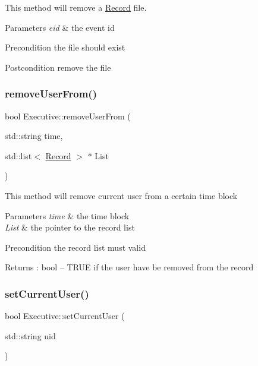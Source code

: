 This method will remove a \mbox{\hyperlink{class_record}{Record}} file. 
\begin{DoxyParams}{Parameters}
{\em eid} & the event id \\
\hline
\end{DoxyParams}
\begin{DoxyPrecond}{Precondition}
the file should exist 
\end{DoxyPrecond}
\begin{DoxyPostcond}{Postcondition}
remove the file 
\end{DoxyPostcond}
\mbox{\label{class_executive_a1df250bced0d7d74ce5017cd1a225e4d}} 
\subsubsection{\texorpdfstring{remove\+User\+From()}{removeUserFrom()}}
{\footnotesize\ttfamily bool Executive\+::remove\+User\+From (\begin{DoxyParamCaption}\item[{std\+::string}]{time,  }\item[{std\+::list$<$ \mbox{\hyperlink{class_record}{Record}} $>$ $\ast$}]{List }\end{DoxyParamCaption})}

This method will remove current user from a certain time block 
\begin{DoxyParams}{Parameters}
{\em time} & the time block \\
\hline
{\em List} & the pointer to the record list \\
\hline
\end{DoxyParams}
\begin{DoxyPrecond}{Precondition}
the record list must valid 
\end{DoxyPrecond}
\begin{DoxyReturn}{Returns}
\+: bool -- T\+R\+UE if the user have be removed from the record 
\end{DoxyReturn}
\mbox{\label{class_executive_a8010517a6dd4bbe81ce4a03a91886931}} 
\subsubsection{\texorpdfstring{set\+Current\+User()}{setCurrentUser()}}
{\footnotesize\ttfamily bool Executive\+::set\+Current\+User (\begin{DoxyParamCaption}\item[{std\+::string}]{uid }\end{DoxyParamCaption})}

